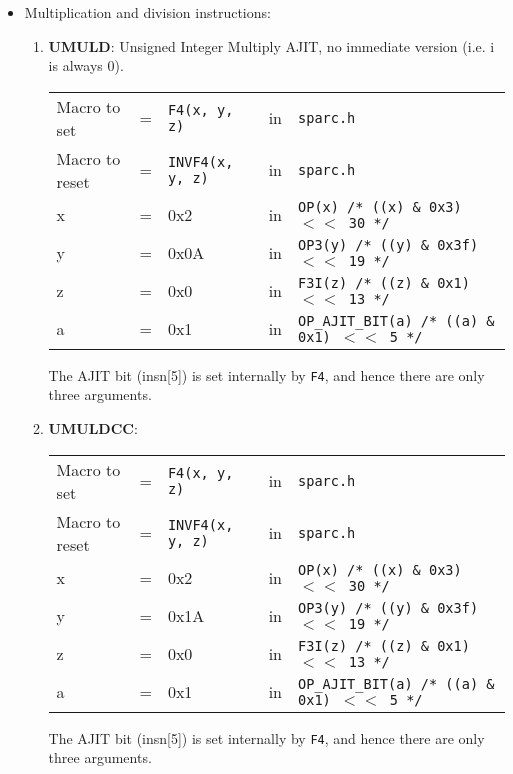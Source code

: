 \begin{itemize}
\item {Multiplication and division instructions:} \\
  \begin{enumerate}
  \item \textbf{UMULD}: Unsigned Integer Multiply AJIT, no immediate
    version (i.e. i is always 0).\\
    \begin{tabular}[h]{lclcl}
      Macro to set  &=& \texttt{F4(x, y, z)} &in& \texttt{sparc.h}     \\
      Macro to reset  &=& \texttt{INVF4(x, y, z)} &in& \texttt{sparc.h}     \\
      x &=& 0x2      &in& \texttt{OP(x)  /* ((x) \& 0x3)  $<<$ 30 */} \\
      y &=& 0x0A     &in& \texttt{OP3(y) /* ((y) \& 0x3f) $<<$ 19 */} \\
      z &=& 0x0      &in& \texttt{F3I(z) /* ((z) \& 0x1)  $<<$ 13 */} \\
      a &=& 0x1      &in& \texttt{OP\_AJIT\_BIT(a) /* ((a) \& 0x1)  $<<$ 5 */}
    \end{tabular}

    The AJIT bit  (insn[5]) is set internally by  \texttt{F4}, and hence
    there are only three arguments.

  \item \textbf{UMULDCC}:\\
    \begin{tabular}[h]{lclcl}
      Macro to set  &=& \texttt{F4(x, y, z)} &in& \texttt{sparc.h}     \\
      Macro to reset  &=& \texttt{INVF4(x, y, z)} &in& \texttt{sparc.h}     \\
      x &=& 0x2      &in& \texttt{OP(x)  /* ((x) \& 0x3)  $<<$ 30 */} \\
      y &=& 0x1A     &in& \texttt{OP3(y) /* ((y) \& 0x3f) $<<$ 19 */} \\
      z &=& 0x0      &in& \texttt{F3I(z) /* ((z) \& 0x1)  $<<$ 13 */} \\
      a &=& 0x1      &in& \texttt{OP\_AJIT\_BIT(a) /* ((a) \& 0x1)  $<<$ 5 */}
    \end{tabular}

    The AJIT bit  (insn[5]) is set internally by  \texttt{F4}, and hence
    there are only three arguments.


\end{enumerate}
\end{itemize}
